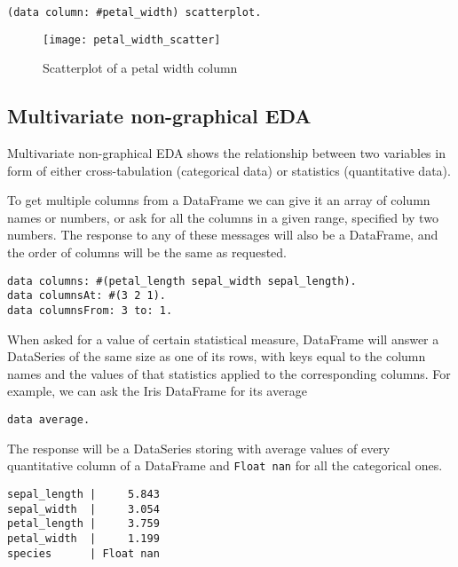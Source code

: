\documentclass[sigplan]{acmart}
\begin{document}
\begin{lstlisting}[basicstyle=\small,language=Smalltalk]
(data column: #petal_width) scatterplot.
\end{lstlisting}
\begin{figure}[H]
  \begin{center}
  \texttt{[image: petal\_width\_scatter]}
  \caption{Scatterplot of a petal width column}
  \end{center}
\end{figure}

\subsection{Multivariate non-graphical EDA}
\label{sec:multi-non}

Multivariate non-graphical EDA shows the relationship between two variables in form of either cross-tabulation (categorical data) or statistics (quantitative data).

To get multiple columns from a DataFrame we can give it an array of column names or numbers, or ask for all the columns in a given range, specified by two numbers. The response to any of these messages will also be a DataFrame, and the order of columns will be the same as requested.

\begin{lstlisting}[basicstyle=\small,language=Smalltalk]
data columns: #(petal_length sepal_width sepal_length).
data columnsAt: #(3 2 1).
data columnsFrom: 3 to: 1.
\end{lstlisting}

When asked for a value of certain statistical measure, DataFrame will answer a DataSeries of the same size as one of its rows, with keys equal to the column names and the values of that statistics applied to the corresponding columns. For example, we can ask the Iris DataFrame for its average

\begin{lstlisting}[basicstyle=\small,language=Smalltalk]
data average.
\end{lstlisting}

The response will be a DataSeries storing with average values of every quantitative column of a DataFrame and \texttt{Float nan} for all the categorical ones.

\begin{lstlisting}[basicstyle=\small]
sepal_length |     5.843
sepal_width  |     3.054
petal_length |     3.759
petal_width  |     1.199
species      | Float nan
\end{lstlisting}
\end{document}
